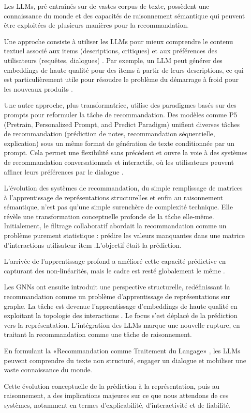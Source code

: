 Les LLMs, pré-entraînés sur de vastes corpus de texte, possèdent une connaissance du monde et des capacités de raisonnement sémantique qui peuvent être exploitées de plusieurs manières pour la recommandation. 

Une approche consiste à utiliser les LLMs pour mieux comprendre le contenu textuel associé aux items (descriptions, critiques) et aux préférences des utilisateurs (requêtes, dialogues) \citep{Zhang2024A, Wang2024A}. Par exemple, un LLM peut générer des embeddings de haute qualité pour des items à partir de leurs descriptions, ce qui est particulièrement utile pour résoudre le problème du démarrage à froid pour les nouveaux produits \citep{Sanner2023Foundational}.

Une autre approche, plus transformatrice, utilise des paradigmes basés sur des prompts pour reformuler la tâche de recommandation. Des modèles comme P5 (Pretrain, Personalized Prompt, and Predict Paradigm) \citet{Geng2022Recommendation} unifient diverses tâches de recommandation (prédiction de notes, recommandation séquentielle, explication) sous un même format de génération de texte conditionnée par un prompt. Cela permet une flexibilité sans précédent et ouvre la voie à des systèmes de recommandation conversationnels et interactifs, où les utilisateurs peuvent affiner leurs préférences par le dialogue \citep{Wang2024A}.

L'évolution des systèmes de recommandation, du simple remplissage de matrices à l'apprentissage de représentations structurelles et enfin au raisonnement sémantique, n'est pas qu'une simple surenchère de complexité technique. Elle révèle une transformation conceptuelle profonde de la tâche elle-même. Initialement, le filtrage collaboratif abordait la recommandation comme un problème purement statistique : prédire les valeurs manquantes dans une matrice d'interactions utilisateur-item \citep{Sarwar2001, Su2009}.L'objectif était la prédiction.

L'arrivée de l'apprentissage profond a amélioré cette capacité prédictive en capturant des non-linéarités, mais le cadre est resté globalement le même \citet{He2017}.

Les GNNs ont ensuite introduit une perspective structurelle, redéfinissant la recommandation comme un problème d'apprentissage de représentations sur graphe. La tâche est devenue l'apprentissage d'embeddings de haute qualité en exploitant la topologie des interactions \citep{Wang2019, Wu2023Graph}. Le focus s'est déplacé de la prédiction vers la représentation. L'intégration des LLMs marque une nouvelle rupture, en traitant la recommandation comme une tâche de raisonnement. 

En formulant la «Recommandation comme Traitement du Langage» \citet{Geng2022Recommendation}, les LLMs peuvent comprendre du texte non structuré, engager un dialogue et mobiliser une vaste connaissance du monde. 

Cette évolution conceptuelle de la prédiction à la représentation, puis au raisonnement, a des implications majeures sur ce que nous attendons de ces systèmes, notamment en termes d'explicabilité, d'interactivité et de fiabilité.
